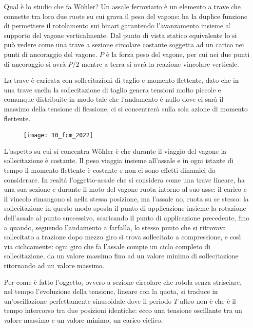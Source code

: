 		Qual è lo studio che fa Wöhler? Un assale ferroviario è un elemento a trave che connette tra loro due ruote su cui grava il peso del vagone: ha la duplice funzione di permettere il rotolamento sui binari garantendo l'avanzamento insieme al supporto del vagone verticalmente. Dal punto di vista statico equivalente lo si può vedere come una trave a sezione circolare costante soggetta ad un carico nei punti di ancoraggio del vagone. $P$ è la forza peso del vagone, per cui nei due punti di ancoraggio si avrà $P/2$ mentre a terra si avrà la reazione vincolare verticale.
		
		La trave è caricata con sollecitazioni di taglio e momento flettente, dato che in una trave snella la sollecitazione di taglio genera tensioni molto piccole e comunque distribuite in modo tale che l'andamento è nullo dove ci sarà il massimo della tensione di flessione, ci si concentrerà sulla sola azione di momento flettente. 
		

		\begin{figure}[H]
		\texttt{[image: 10\_fcm\_2022]}
		\end{figure}

		
		L'aspetto su cui si concentra Wöhler è che durante il viaggio del vagone la sollecitazione è costante. Il peso viaggia insieme all'assale e in ogni istante di tempo il momento flettente è costante e non ci sono effetti dinamici da considerare. In realtà l'oggetto-assale che si considera come una trave lineare, ha una sua sezione e durante il moto del vagone ruota intorno al suo asse: il carico e il vincolo rimangono sì nella stessa posizione, ma l'assale no, ruota su se stesso: la sollecitazione in questo modo sposta il punto di applicazione insieme la rotazione dell'assale al punto successivo, scaricando il punto di applicazione precedente, fino a quando, seguendo l'andamento a farfalla, lo stesso punto che si ritrovava sollecitato a trazione dopo mezzo giro si trova sollecitato a compressione, e così via ciclicamente: ogni giro che fa l'assale compie un ciclo completo di sollecitazione, da un valore massimo fino ad un valore minimo di sollecitazione ritornando ad un valore massimo.
		
		Per come è fatto l'oggetto, ovvero a sezione circolare che rotola senza strisciare, nel tempo l'evoluzione della tensione, lineare con la quota, si traduce in un'oscillazione perfettamente sinusoidale dove il periodo $ T $ altro non è che è il tempo intercorso tra due posizioni identiche: ecco una tensione oscillante tra un valore massimo  e un valore minimo, un carico ciclico. \newline
		
